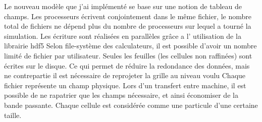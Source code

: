 Le nouveau modèle que j'ai implémenté se base sur une notion de tableau de champs.
Les processeurs écrivent conjointement dans le même fichier, le nombre total de fichiers ne dépend plus du nombre de processeurs sur lequel a tourné la simulation.
Les écriture sont réalisées en parallèles grâce a l' utilisation de la librairie hdf5
Selon file-système des calculateurs, il est possible d'avoir un nombre limité de fichier par utilisateur.
Seules les feuilles (les cellules non raffinées) sont écrites sur le disque.
Ce qui permet de réduire la redondance des données, mais ne contrepartie il est nécessaire de reprojeter la grille au niveau voulu 
Chaque fichier représente un champ physique.
Lors d'un transfert entre machine, il est possible de ne rapatrier que les champs nécessaire, et ainsi économiser de la bande passante.
Chaque cellule est considérée comme une particule d'une certaine taille.



%





